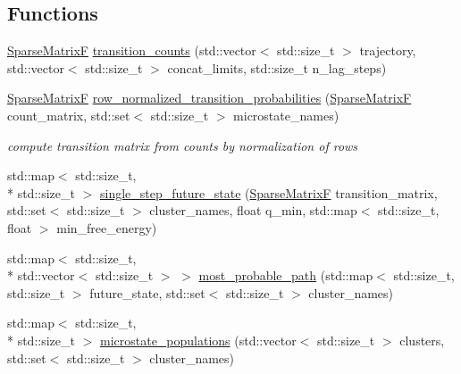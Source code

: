\subsection*{Functions}
\begin{DoxyCompactItemize}
\item 
\hyperlink{namespaceClustering_1_1MPP_aab655de2feb4b56dd87bcc0fc6f13974}{Sparse\-Matrix\-F} \hyperlink{namespaceClustering_1_1MPP_a2851e170991a688c5abce05377f43a06}{transition\-\_\-counts} (std\-::vector$<$ std\-::size\-\_\-t $>$ trajectory, std\-::vector$<$ std\-::size\-\_\-t $>$ concat\-\_\-limits, std\-::size\-\_\-t n\-\_\-lag\-\_\-steps)
\item 
\hypertarget{namespaceClustering_1_1MPP_aebb74cbd76ee8b6f9324dd3b882b4b23}{\hyperlink{namespaceClustering_1_1MPP_aab655de2feb4b56dd87bcc0fc6f13974}{Sparse\-Matrix\-F} \hyperlink{namespaceClustering_1_1MPP_aebb74cbd76ee8b6f9324dd3b882b4b23}{row\-\_\-normalized\-\_\-transition\-\_\-probabilities} (\hyperlink{namespaceClustering_1_1MPP_aab655de2feb4b56dd87bcc0fc6f13974}{Sparse\-Matrix\-F} count\-\_\-matrix, std\-::set$<$ std\-::size\-\_\-t $>$ microstate\-\_\-names)}\label{namespaceClustering_1_1MPP_aebb74cbd76ee8b6f9324dd3b882b4b23}

\begin{DoxyCompactList}\small\item\em compute transition matrix from counts by normalization of rows \end{DoxyCompactList}\item 
std\-::map$<$ std\-::size\-\_\-t, \\*
std\-::size\-\_\-t $>$ \hyperlink{namespaceClustering_1_1MPP_a4bb2e82d60d7efc807597a46c435a8e3}{single\-\_\-step\-\_\-future\-\_\-state} (\hyperlink{namespaceClustering_1_1MPP_aab655de2feb4b56dd87bcc0fc6f13974}{Sparse\-Matrix\-F} transition\-\_\-matrix, std\-::set$<$ std\-::size\-\_\-t $>$ cluster\-\_\-names, float q\-\_\-min, std\-::map$<$ std\-::size\-\_\-t, float $>$ min\-\_\-free\-\_\-energy)
\item 
std\-::map$<$ std\-::size\-\_\-t, \\*
std\-::vector$<$ std\-::size\-\_\-t $>$ $>$ \hyperlink{namespaceClustering_1_1MPP_ac794f6bda2f9a96c46300ae191dd9515}{most\-\_\-probable\-\_\-path} (std\-::map$<$ std\-::size\-\_\-t, std\-::size\-\_\-t $>$ future\-\_\-state, std\-::set$<$ std\-::size\-\_\-t $>$ cluster\-\_\-names)
\item 
\hypertarget{namespaceClustering_1_1MPP_ae25b19b43ae12a84dec8ed0206556286}{std\-::map$<$ std\-::size\-\_\-t, \\*
std\-::size\-\_\-t $>$ \hyperlink{namespaceClustering_1_1MPP_ae25b19b43ae12a84dec8ed0206556286}{microstate\-\_\-populations} (std\-::vector$<$ std\-::size\-\_\-t $>$ clusters, std\-::set$<$ std\-::size\-\_\-t $>$ cluster\-\_\-names)}\label{namespaceClustering_1_1MPP_ae25b19b43ae12a84dec8ed0206556286}


\end{DoxyCompactItemize}
